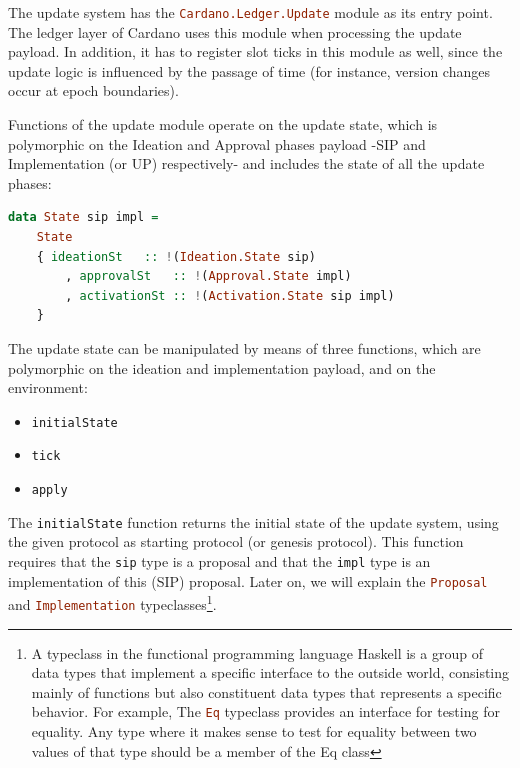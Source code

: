 The update system has the \lstinline[language=Haskell]!Cardano.Ledger.Update! 
module as its entry
point. The ledger layer of Cardano uses this module when processing the update
payload. In addition, it has to register slot ticks in this module as well,
since the update logic is influenced by the passage of time (for instance,
version changes occur at epoch boundaries).

Functions of the update module operate on the update state, which is
polymorphic on the Ideation and Approval phases payload -SIP and 
Implementation (or UP) respectively- and includes the state of
all the update phases:


\begin{lstlisting}[language=Haskell]
	data State sip impl =
	State
	{ ideationSt   :: !(Ideation.State sip)
		, approvalSt   :: !(Approval.State impl)
		, activationSt :: !(Activation.State sip impl)
	}
\end{lstlisting}

The update state can be manipulated by means of three functions, which are
polymorphic on the ideation and implementation payload, and on the environment:
\begin{itemize}
	\item \lstinline[language=Haskell]!initialState!
	\item \lstinline[language=Haskell]!tick!
	\item \lstinline[language=Haskell]!apply!
\end{itemize}

The \lstinline[language=Haskell]!initialState! function returns the initial 
state of the update
system, using the given protocol as starting protocol (or genesis protocol).
This function requires that the \lstinline[language=Haskell]!sip! type is a 
proposal and that the
\lstinline[language=Haskell]!impl! type is an implementation of this (SIP) 
proposal. Later on, we
will explain the \lstinline[language=Haskell]!Proposal! and 
\lstinline[language=Haskell]!Implementation! typeclasses\footnote{A typeclass 
	in the functional programming language Haskell is a group of data types 
	that 
	implement a specific interface to the outside world, consisting mainly of 
	functions but also constituent data types that represents a specific 
	behavior. 
	For example, The \lstinline[language=Haskell]!Eq! typeclass provides an 
	interface for testing for equality. Any type where it makes sense to test 
	for 
	equality between two values of that type should be a member of the Eq 
	class}.

